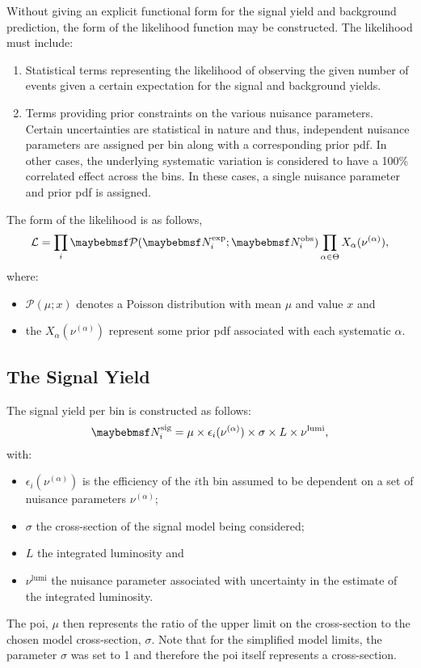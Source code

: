 Without giving an explicit functional form for the signal yield and background
prediction, the form of the likelihood function may be constructed. The
likelihood must include:
\begin{enumerate}
\item Statistical terms representing the likelihood of observing the given
  number of events given a certain expectation for the signal and background
  yields.
\item Terms providing prior constraints on the various nuisance
  parameters. Certain uncertainties are statistical in nature and thus,
  independent nuisance parameters are assigned per bin along with a corresponding
  prior pdf. In other cases, the underlying systematic variation is considered
  to have a 100\% correlated effect across the bins. In these cases, a single
  nuisance parameter and prior pdf is assigned.
\end{enumerate}

The form of the likelihood is as follows,
\begin{equation*}
\mathcal{L} = \prod_i \Poisson(\NExpi ; \NObsi)
\prod_{\alpha \in \Theta}  X_\alpha(\nu^{(\alpha)}),
\end{equation*}
where:
\begin{itemize}
\item $\mathcal{P}(\mu;x)$ denotes a Poisson distribution with mean $\mu$ and value
$x$ and
\item the $X_\alpha(\nu^{(\alpha)})$ represent some prior pdf associated with
  each systematic $\alpha$.
\end{itemize}

\subsection{The Signal Yield}
The signal yield per bin is constructed as follows:
\begin{equation*}
\NSigi = \mu \times \epsilon_i(\nu^{(\alpha)}) \times \sigma \times L \times \nu^{\textrm{lumi}},
\end{equation*}
with:
\begin{itemize}
\item $\epsilon_i(\nu^{(\alpha)})$ is the efficiency of the $i$th bin assumed to be
  dependent on a set of nuisance parameters $\nu^{(\alpha)}$;
\item $\sigma$ the cross-section of the signal model being considered;
\item $L$ the integrated luminosity and
\item $\nu^{\textrm{lumi}}$ the nuisance parameter associated with uncertainty in the
estimate of the integrated luminosity.
\end{itemize}
The \ac{poi}, $\mu$ then represents the ratio of the upper limit on the
cross-section to the chosen model cross-section, $\sigma$. Note that for the
simplified model limits, the parameter $\sigma$ was set to 1 and therefore the
\ac{poi} itself represents a cross-section.

